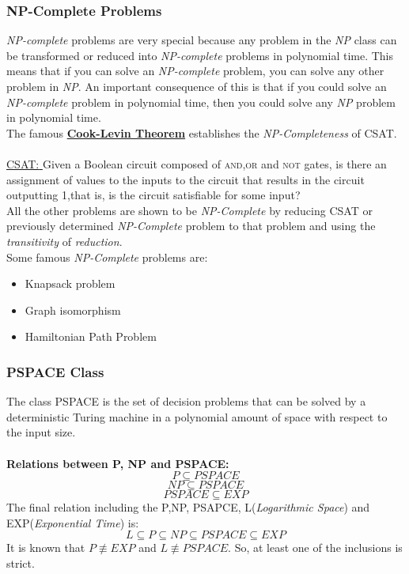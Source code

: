 \subsubsection{NP-Complete Problems}
 {\it NP-complete } problems are very special because any problem in the {\it NP} class can be transformed or reduced into {\it NP-complete} problems in polynomial time. This means that if you can solve an {\it NP-complete} problem, you can solve any other problem in {\it NP}. An important consequence of this is that if you could solve an {\it NP-complete} problem in polynomial time, then you could solve any {\it NP} problem in polynomial time. \\
The famous \href{https://en.wikipedia.org/wiki/Cook-Levin_theorem}
{\bf Cook-Levin Theorem} establishes the {\it NP-Completeness} of {\scshape CSAT}.
\\\\ \href{https://en.wikipedia.org/wiki/Boolean_satisfiability_problem}
{\scshape CSAT: }Given a Boolean circuit composed of {\scshape and,or} and {\scshape not} gates, is there an assignment of values to the inputs to the circuit that results in the circuit outputting 1,that is, is the circuit satisfiable for some input?\\
All the other problems are shown to be {\it NP-Complete} by reducing {\scshape CSAT} or previously determined {\it NP-Complete} problem to that problem and using the {\it transitivity} of {\it reduction}.\\
Some famous {\it NP-Complete} problems are:
\begin{itemize}
\item Knapsack problem
\item Graph isomorphism
\item Hamiltonian Path Problem
\end{itemize} 

\subsubsection{PSPACE Class}
The class PSPACE is the set of decision problems that can be solved by a deterministic Turing machine in a polynomial amount of space with respect to the input size. \\\\
{\bf Relations between P, NP and PSPACE:}
\[ P \subseteq PSPACE \]
\[ NP \subseteq PSPACE \]
\[ PSPACE \subseteq EXP \]
The final relation including the P,NP, PSAPCE, L({\it Logarithmic Space}) and EXP({\it Exponential Time}) is:
\[ L \subseteq P \subseteq NP \subseteq PSPACE \subseteq EXP \]
It is known that {$P \not\equiv EXP$} and {$L \not\equiv PSPACE$}. So, at least one of the inclusions is strict.

